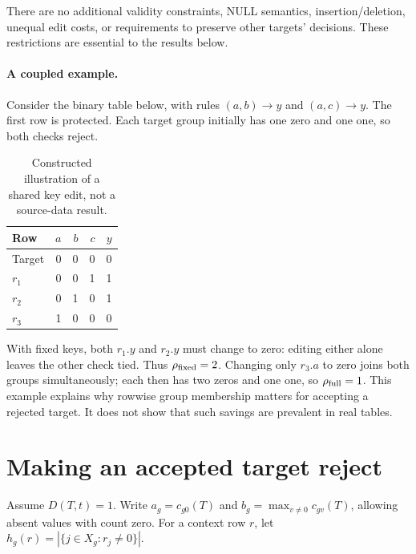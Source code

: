 \documentclass[11pt]{article}
\begin{document}
There are no additional validity constraints, NULL semantics, insertion/deletion,
unequal edit costs, or requirements to preserve other targets' decisions. These
restrictions are essential to the results below.


\paragraph{A coupled example.}
Consider the binary table below, with rules $(a,b)\to y$ and $(a,c)\to y$.
The first row is protected. Each target group initially has one zero and one
one, so both checks reject.
\begin{table}[H]
\centering\small
\begin{tabular}{lrrrr}
\toprule
Row & $a$ & $b$ & $c$ & $y$\\
\midrule
Target &0&0&0&0\\
$r_1$ &0&0&1&1\\
$r_2$ &0&1&0&1\\
$r_3$ &1&0&0&0\\
\bottomrule
\end{tabular}
\caption{Constructed illustration of a shared key edit, not a source-data result.}
\end{table}
With fixed keys, both $r_1.y$ and $r_2.y$ must change to zero: editing either
alone leaves the other check tied. Thus $\rho_{\rm fixed}=2$.
Changing only $r_3.a$ to zero joins both groups simultaneously; each then has
two zeros and one one, so $\rho_{\rm full}=1$. This example explains why
rowwise group membership matters for accepting a rejected target. It does not
show that such savings are prevalent in real tables.

\section{Making an accepted target reject}
Assume $D(T,t)=1$. Write $a_g=c_{g0}(T)$ and
$b_g=\max_{v\ne0}c_{gv}(T)$, allowing absent values with count zero.
For a context row $r$, let
$h_g(r)=|\{j\in X_g:r_j\ne0\}|$.
\end{document}
